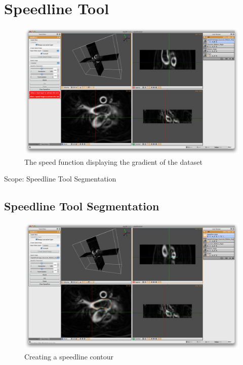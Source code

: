 \documentclass[fleqn,11pt,openany]{book}
\begin{document}
\chapter{Speedline Tool}

\begin{figure}
\includegraphics[width=\textwidth]{Seg3DTutorial_figures/SpeedlineImage.png}
\caption{The speed function displaying the gradient of the dataset}\label{fig:SpeedImage}
\end{figure}

\begin{introduction}
Scope: Speedline Tool Segmentation
\end{introduction}

\section{Speedline Tool Segmentation}

\begin{figure}
\includegraphics[width=\textwidth]{Seg3DTutorial_figures/Speedline.png}
\caption{Creating a speedline contour}\label{fig:SpeedLine1}
\end{figure}
\end{document}
